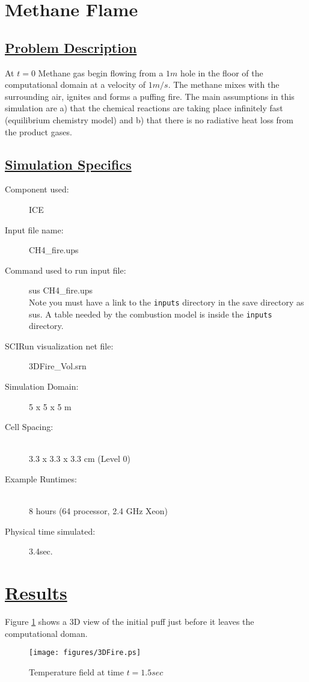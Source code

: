 \documentclass[fleqn]{article}
\begin{document}
\section*{\center Methane Flame}
\subsection*{\underline{Problem Description}}
At $t=0$ Methane gas begin flowing from a $1m$ hole in the floor of the computational domain at a
velocity of $1m/s$.  The methane mixes with the surrounding air, ignites and forms a puffing fire. 
The main assumptions in this simulation are a) that the chemical reactions are taking place infinitely
fast (equilibrium chemistry model) and b) that there is no radiative heat loss from the product
gases.
\subsection*{\underline{Simulation Specifics}}
\begin{description} 
\item [Component used:] \hfill ICE
\item [Input file name:] \hfill CH4\_fire.ups
\item [Command used to run input file:]\hfill sus CH4\_fire.ups \\
Note you must have a link to the {\tt inputs} directory in the save directory as sus.  A table needed
by the combustion model is inside the {\tt inputs} directory.
\item [SCIRun visualization net file:]\hfill 3DFire\_Vol.srn \\


\item [Simulation Domain:]\hfill    5 x 5 x 5 m
\item [Cell Spacing:]\hfill \\ 
3.3 x 3.3 x 3.3 cm (Level 0)


\item [Example Runtimes:] \hfill \\
 8 hours   (64 processor, 2.4 GHz Xeon)

\item [Physical time simulated:] \hfill 3.4sec.

\end{description}

\section*{\underline{Results}}
Figure \ref{results.CH4} shows a 3D view of the initial puff just before it leaves the computational
doman.  
\begin{figure}
\texttt{[image: figures/3DFire.ps]}
\caption{Temperature field at time $t = 1.5 sec$}
\label{results.CH4}
\end{figure}
\newpage



\end{document}
